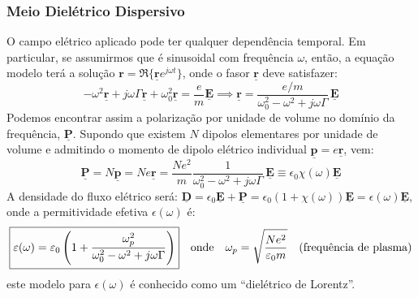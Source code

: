 \subsubsection{Meio Dielétrico Dispersivo}

O campo elétrico aplicado pode ter qualquer dependência temporal. Em particular, se assumirmos que é sinusoidal com frequência $\omega$, então, a equação modelo terá a solução $\mathbf{r} = \Re\{\mathbf{\underline{r}} e^{j\omega t}\}$, onde o fasor $\mathbf{\underline{r}}$ deve satisfazer:
$$
    -\omega^2 \mathbf{\underline{r}} + j\omega \Gamma \mathbf{\underline{r}} + \omega_0^2 \mathbf{\underline{r}} = \frac{e}{m} \mathbf{\underline{E}}
    \implies
    \mathbf{\underline{r}} = \frac{e/m}{\omega_0^2 - \omega^2 + j\omega\Gamma}\, \mathbf{\underline{E}}
$$
Podemos encontrar assim a polarização por unidade de volume no domínio da frequência, $\mathbf{\underline{P}}$. Supondo que existem $N$ dipolos elementares por unidade de volume e admitindo o momento de dipolo elétrico individual $\mathbf{\underline{p}} = e\mathbf{\underline{r}}$, vem:
$$
    \mathbf{\underline{P}} = N \mathbf{\underline{p}} = Ne\mathbf{\underline{r}} = \frac{Ne^2}{m} \frac{1}{\omega_0^2 - \omega^2 + j\omega\Gamma}\, \mathbf{\underline{E}} \equiv \epsilon_0 \chi(\omega) \mathbf{\underline{E}}
$$
A densidade do fluxo elétrico será: $\mathbf{\underline{D}} = \epsilon_0 \mathbf{\underline{E}} + \mathbf{\underline{P}} = \epsilon_0 (1 + \chi(\omega)) \mathbf{\underline{E}} = \epsilon(\omega) \mathbf{\underline{E}}$, onde a permitividade efetiva $\epsilon(\omega)$ é:
$$
    \boxed{%
        \epsilon(\omega) = \epsilon_0 \left( 1 + \frac{\omega_p^2}{\omega_0^2 - \omega^2 + j\omega\Gamma} \right)
    }
    \quad \text{onde} \quad
    \omega_p = \sqrt{\frac{N e^2}{\epsilon_0 m}} \quad \text{(frequência de plasma)}
$$
este modelo para $\epsilon(\omega)$ é conhecido como um ``dielétrico de Lorentz''.

